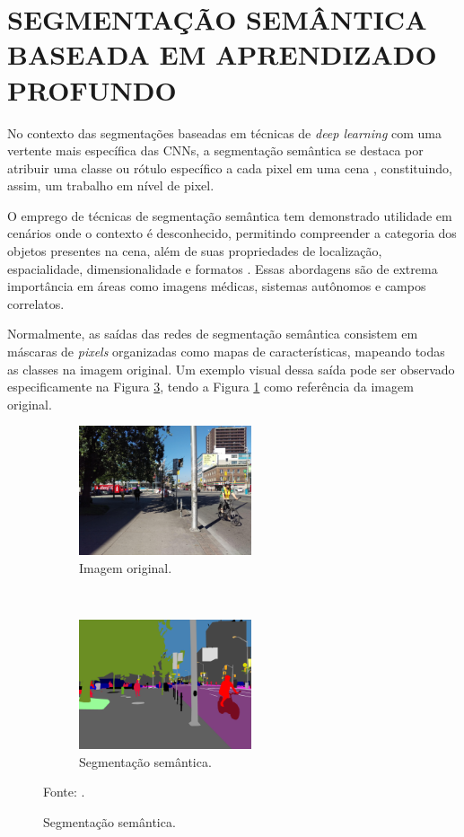 \clearpage
\newpage


\section{SEGMENTAÇÃO SEMÂNTICA BASEADA EM APRENDIZADO PROFUNDO}
\label{semantic}
No contexto das segmentações baseadas em técnicas de \textit{deep learning} com uma vertente mais específica das CNNs, a segmentação semântica se destaca por atribuir uma classe ou rótulo específico a cada pixel em uma cena \citep{Wang2017, Ghosh2019, Shelhamer2016, Arbelaez2012, Zhang2018}, constituindo, assim, um trabalho em nível de pixel.

O emprego de técnicas de segmentação semântica tem demonstrado utilidade em cenários onde o contexto é desconhecido, permitindo compreender a categoria dos objetos presentes na cena, além de suas propriedades de localização, espacialidade, dimensionalidade e formatos \citep{Zhang2018}. Essas abordagens são de extrema importância em áreas como imagens médicas, sistemas autônomos e campos correlatos.

Normalmente, as saídas das redes de segmentação semântica consistem em máscaras de \textit{pixels} organizadas como mapas de características, mapeando todas as classes na imagem original. Um exemplo visual dessa saída pode ser observado especificamente na Figura \ref{semantic:fig:3.2}, tendo a Figura \ref{semantic:fig:3.1} como referência da imagem original.

\begin{figure}[H]
   \caption{Segmentação semântica.}
   \centering
   \label{semantic:fig:3}
    \begin{subfigure}[t]{0.45\textwidth}
        \centering
        \includegraphics[height=1.5in]{recursos/imagens/semantic/t1.jpg}
        \caption{Imagem original.}
        \label{semantic:fig:3.1}
    \end{subfigure}%
    ~ 
    \begin{subfigure}[t]{0.45\textwidth}
        \centering
        \includegraphics[height=1.5in]{recursos/imagens/semantic/s1.png}
        \caption{Segmentação semântica.}
        \label{semantic:fig:3.2}
    \end{subfigure}%

    Fonte: \cite{Neuhold2017_ICCV}.
\end{figure}

